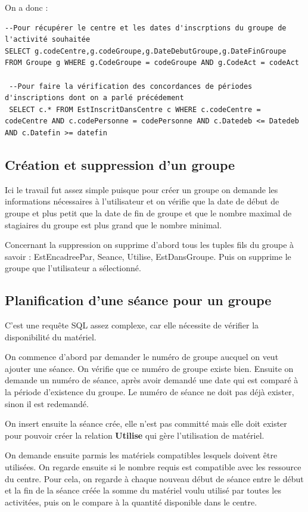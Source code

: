 \documentclass[10pt]{article}
\begin{document}
On a donc : 

 \begin{small}
\begin{verbatim}
--Pour récupérer le centre et les dates d'inscrptions du groupe de l'activité souhaitée
SELECT g.codeCentre,g.codeGroupe,g.DateDebutGroupe,g.DateFinGroupe FROM Groupe g WHERE g.CodeGroupe = codeGroupe AND g.CodeAct = codeAct

 --Pour faire la vérification des concordances de périodes d'inscriptions dont on a parlé précédement
 SELECT c.* FROM EstInscritDansCentre c WHERE c.codeCentre = codeCentre AND c.codePersonne = codePersonne AND c.Datedeb <= Datedeb AND c.Datefin >= datefin
\end{verbatim}
\end{small}

\subsection{Création et suppression d'un groupe}

Ici le travail fut assez simple puisque pour créer un groupe on demande les informations nécessaires à l'utilisateur et on vérifie que la date de début de groupe et plus petit que la date de fin de groupe et que le nombre maximal de stagiaires du groupe est plus grand que le nombre minimal. 

Concernant la suppression on supprime d'abord tous les tuples fils du groupe à savoir : EstEncadreePar, Seance, Utilise, EstDansGroupe. Puis on supprime le groupe que l'utilisateur a sélectionné.
\subsection{Planification d'une séance pour un groupe}


C'est une requête SQL assez complexe, car elle nécessite de vérifier la disponibilité du matériel.

On commence d'abord par demander le numéro de groupe aucquel on veut ajouter une séance. On vérifie que ce numéro
de groupe existe bien. Ensuite on demande un numéro de séance, après avoir demandé une date qui est comparé à la
période d'existence du groupe. Le numéro de séance ne doit pas déjà exister, sinon il est redemandé.

On insert ensuite la séance crée, elle n'est pas committé mais elle doit exister pour pouvoir créer la relation
\textbf{Utilise} qui gère l'utilisation de matériel. 

On demande ensuite parmis les matériels compatibles lesquels doivent être utilisées. On regarde ensuite si le nombre requis est
compatible avec les ressource du centre. Pour cela, on regarde à chaque nouveau début de séance entre le début et la fin de la séance
créée la somme du matériel voulu utilisé par toutes les activitées, puis on le compare à la quantité disponible dans le centre.
\end{document}

